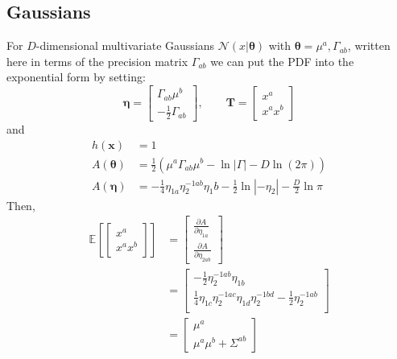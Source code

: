 \documentclass[aps,showpacs,twocolumn,prd,superscriptaddress,nofootinbib]{revtex4}
\newcommand{\nn}{\nonumber}
\newcommand{\E}[1]{{\mathbb E}_{#1}\!}
\begin{document}
\subsection{Gaussians}
For $D$-dimensional multivariate Gaussians $\mathcal{N}(x|\bm\theta)$ with $\bm\theta={\mu^a,\Gamma_{ab}}$, written here in terms of the precision matrix $\Gamma_{ab}$ we can put the PDF into the exponential form by setting:
\begin{equation}
\bm\eta=
\begin{bmatrix}
  \Gamma_{ab}\mu^b\\
  -\frac12\Gamma_{ab}
\end{bmatrix},\qquad
\bm T=
\begin{bmatrix}
  x^a\\
  x^ax^b
\end{bmatrix}\label{eq:Normalexp}
\end{equation}
and
\begin{align}
h(\bm x)&=1\nn\\
A(\bm\theta)&=\frac12\left(\mu^a\Gamma_{ab}\mu^b-\ln|\Gamma|-D\ln(2\pi)\right)\label{eq:NormalAth}\\
A(\bm\eta)&=-\frac14\eta_{1a}\eta_2^{-1ab}\eta_1{b}-\frac12\ln\left|{-\eta_2}\right|-\frac D2\ln\pi\nn
\end{align}
Then, 
\begin{align*}
\E{}\left[ 
\begin{bmatrix}
  x^a\\
  x^ax^b
\end{bmatrix}
\right]
&=
\begin{bmatrix}
  \frac{\partial A}{\partial\eta_{1a}}\\[.7ex]
  \frac{\partial A}{\partial\eta_{2ab}}
\end{bmatrix}\nn\\
&=
\begin{bmatrix}
-\frac12\eta_{2}^{-1ab}\eta_{1b}\\[.7ex]
\frac14\eta_{1c}\eta_{2}^{-1ac}\eta_{1d}\eta_{2}^{-1bd}-\frac12\eta_{2}^{-1ab}\\  
\end{bmatrix}\nn\\
&=
\begin{bmatrix}
\mu^a\\[.7ex]
\mu^a\mu^b+\Sigma^{ab}
\end{bmatrix}\nn
\end{align*}
\end{document}
